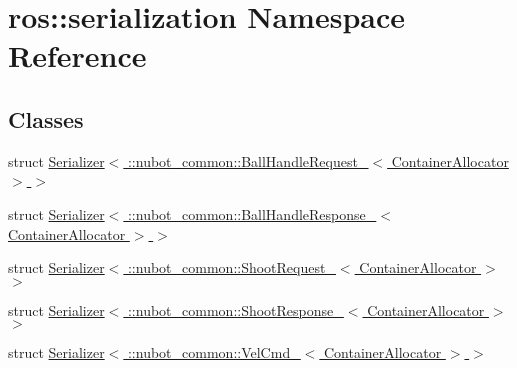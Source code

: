 \hypertarget{namespaceros_1_1serialization}{\section{ros\-:\-:serialization Namespace Reference}
\label{namespaceros_1_1serialization}
}
\subsection*{Classes}
\begin{DoxyCompactItemize}
\item 
struct \hyperlink{structros_1_1serialization_1_1Serializer_3_01_1_1nubot__common_1_1BallHandleRequest___3_01ContainerAllocator_01_4_01_4}{Serializer$<$ \-::nubot\-\_\-common\-::\-Ball\-Handle\-Request\-\_\-$<$ Container\-Allocator $>$ $>$}
\item 
struct \hyperlink{structros_1_1serialization_1_1Serializer_3_01_1_1nubot__common_1_1BallHandleResponse___3_01ContainerAllocator_01_4_01_4}{Serializer$<$ \-::nubot\-\_\-common\-::\-Ball\-Handle\-Response\-\_\-$<$ Container\-Allocator $>$ $>$}
\item 
struct \hyperlink{structros_1_1serialization_1_1Serializer_3_01_1_1nubot__common_1_1ShootRequest___3_01ContainerAllocator_01_4_01_4}{Serializer$<$ \-::nubot\-\_\-common\-::\-Shoot\-Request\-\_\-$<$ Container\-Allocator $>$ $>$}
\item 
struct \hyperlink{structros_1_1serialization_1_1Serializer_3_01_1_1nubot__common_1_1ShootResponse___3_01ContainerAllocator_01_4_01_4}{Serializer$<$ \-::nubot\-\_\-common\-::\-Shoot\-Response\-\_\-$<$ Container\-Allocator $>$ $>$}
\item 
struct \hyperlink{structros_1_1serialization_1_1Serializer_3_01_1_1nubot__common_1_1VelCmd___3_01ContainerAllocator_01_4_01_4}{Serializer$<$ \-::nubot\-\_\-common\-::\-Vel\-Cmd\-\_\-$<$ Container\-Allocator $>$ $>$}
\end{DoxyCompactItemize}
